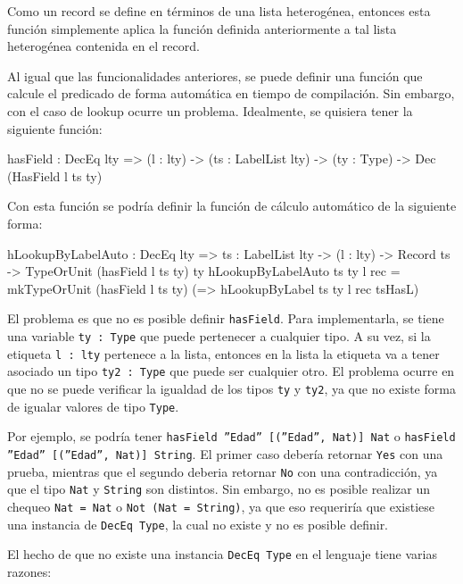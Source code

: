 Como un record se define en términos de una lista heterogénea, entonces esta función simplemente aplica la función definida anteriormente a tal lista heterogénea contenida en el record.

Al igual que las funcionalidades anteriores, se puede definir una función que calcule el predicado de forma automática en tiempo de compilación. Sin embargo, con el caso de lookup ocurre un problema. Idealmente, se quisiera tener la siguiente función:

\begin{code}
hasField : DecEq lty => (l : lty) ->
  (ts : LabelList lty) -> (ty : Type) ->
  Dec (HasField l ts ty)
\end{code}

Con esta función se podría definir la función de cálculo automático de la siguiente forma:

\begin{code}
hLookupByLabelAuto : DecEq lty => {ts : LabelList lty} ->
  (l : lty) -> Record ts ->
  TypeOrUnit (hasField l ts ty) ty
hLookupByLabelAuto {ts} {ty} l rec =
  mkTypeOrUnit (hasField l ts ty)
  (\tsHasL => hLookupByLabel {ts} {ty} l rec tsHasL)
\end{code}

El problema es que no es posible definir \texttt{hasField}. Para implementarla, se tiene una variable \texttt{ty : Type} que puede pertenecer a cualquier tipo. A su vez, si la etiqueta \texttt{l : lty} pertenece a la lista, entonces en la lista la etiqueta va a tener asociado un tipo \texttt{ty2 : Type} que puede ser cualquier otro. El problema ocurre en que no se puede verificar la igualdad de los tipos \texttt{ty} y \texttt{ty2}, ya que no existe forma de igualar valores de tipo \texttt{Type}.

Por ejemplo, se podría tener \texttt{hasField ''Edad'' [(''Edad'', Nat)] Nat} o \texttt{hasField ''Edad'' [(''Edad'', Nat)] String}. El primer caso debería retornar \texttt{Yes} con una prueba, mientras que el segundo deberia retornar \texttt{No} con una contradicción, ya que el tipo \texttt{Nat} y \texttt{String} son distintos. Sin embargo, no es posible realizar un chequeo \texttt{Nat = Nat} o \texttt{Not (Nat = String)}, ya que eso requeriría que existiese una instancia de \texttt{DecEq Type}, la cual no existe y no es posible definir.

El hecho de que no existe una instancia \texttt{DecEq Type} en el lenguaje tiene varias razones:

